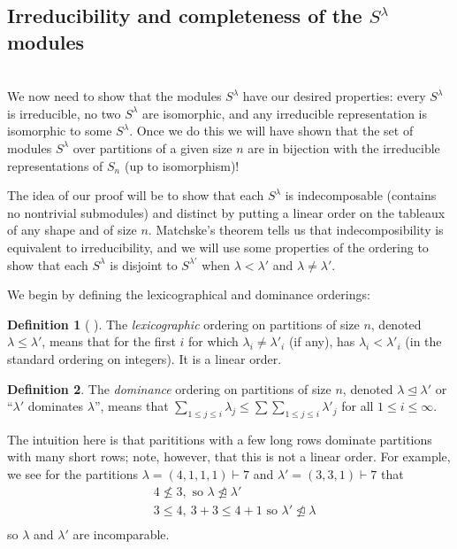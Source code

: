 \documentclass[11 pt]{amsart}
\theoremstyle{plain}   %
\theoremstyle{definition}
\newtheorem{defn}{Definition}[section]
\theoremstyle{remark}
\numberwithin{equation}{section}
\def\normeq{\trianglelefteq}
\begin{document}
\subsection{Irreducibility and completeness of the $S^\lambda$ modules} \hfill\\
We now need to show that the modules $S^\lambda$ have our desired properties: every $S^\lambda$ is irreducible, no two $S^\lambda$ are isomorphic,
and any irreducible representation is isomorphic to some $S^\lambda$. Once we do this we will have shown that the set of modules $S^\lambda$
over partitions of a given size $n$
are in bijection with the irreducible representations of $S_n$ (up to isomorphism)! \par
The idea of our proof will be to show that each $S^\lambda$ is indecomposable (contains no nontrivial submodules)
and distinct by putting a linear order on the tableaux of any shape
and of size $n$. Matchske's theorem tells us that indecomposibility is equivalent to irreducibility, and we will use some properties of the ordering
to show that each $S^\lambda$ is disjoint to $S^{\lambda'}$ when $\lambda < \lambda'$ and $\lambda \neq \lambda'$.
\par
We begin by defining the lexicographical and dominance orderings:
\begin{defn}[ {\cite[pg. 36]{fulton}} ]
  The \emph{lexicographic} ordering on partitions of size $n$, denoted $ \lambda \leq \lambda'$, means that
  for the first $i$ for which $\lambda_i \neq \lambda'_i$ (if any), has $\lambda_i < \lambda'_i$ (in the standard ordering on integers).
  It is a linear order.
\end{defn}
\begin{defn}
  The \emph{dominance} ordering on partitions of size $n$, denoted $ \lambda \normeq \lambda'$ or ``$\lambda'$ dominates $\lambda$'',
  means that $\sum_{1 \leq j \leq i} \lambda_j \leq \sum \sum_{1 \leq j \leq i} \lambda'_j$ for all $ 1 \leq i \leq \infty$. \par
  The intuition here is that parititions with a few long rows dominate partitions with many short rows; note, however, that this is
  not a linear order. For example, we see for the partitions $\lambda = (4,1,1,1) \vdash 7$ and $\lambda' = (3,3,1) \vdash 7$ that
  \begin{align*}
    &4 \not \leq 3, \text{ so $\lambda \not \normeq \lambda'$}\\
    &3 \leq  4, \ 3 + 3 \leq 4 + 1  \text{ so $\lambda' \not \normeq \lambda$}\\
  \end{align*}
  so $\lambda$ and $\lambda'$ are incomparable.
\end{defn}
\end{document}
